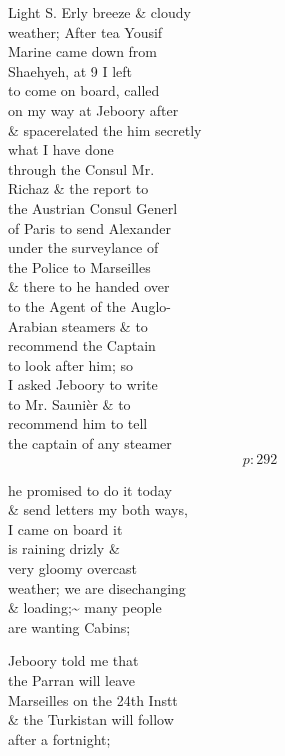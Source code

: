 \documentclass{report}
\begin{document}
	\par{
 	Light S. Erly breeze \& cloudy\ \\weather; After tea Yousif\ \\Marine came down from\ \\Shaehyeh, at 9 I left\ \\to come on board, called\ \\on my way at Jeboory after\ \\\& \lbrack space\rbrack related the him secretly\ \\what I have done\ \\through the Consul Mr.\ \\Richaz \& the report to\ \\the Austrian Consul Generl\ \\of Paris to send Alexander\ \\under the surveylance of\ \\the Police to Marseilles\ \\\& there to he handed over\ \\to the Agent of the Auglo-\ \\Arabian steamers \& to\ \\recommend the Captain\ \\to look after him; so\ \\I asked Jeboory to write\ \\to Mr. Saunièr \& to\ \\recommend him to tell\ \\the captain of any steamer\ \\
  \[p: 292 \]

	}


	\par{
 	he promised to do it today\ \\\& send letters my both ways,\ \\I came on board it\ \\is raining drizly \&\ \\very gloomy overcast\ \\weather; we are disechanging\ \\\& loading;\~{} many people\ \\are wanting Cabins;\ \\
	}

	\par{
 	Jeboory told me that\ \\the Parran will leave\ \\Marseilles on the 24th Instt\ \\\& the Turkistan will follow\ \\after a fortnight;\ \\
	}
\end{document}
